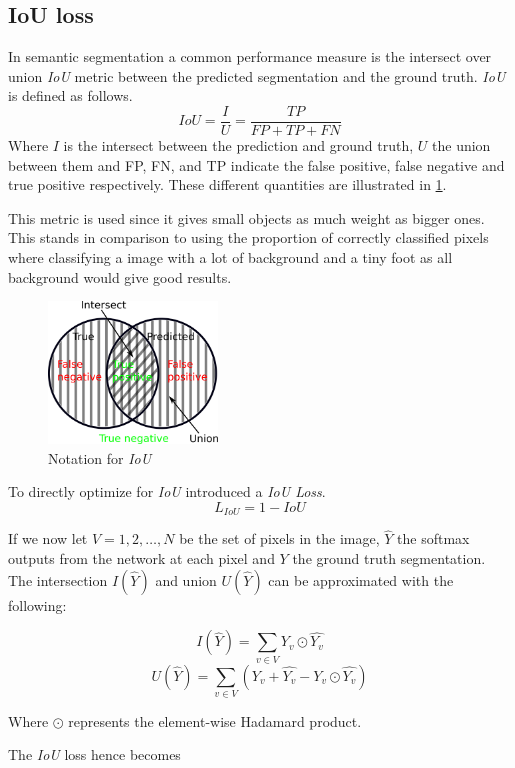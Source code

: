 \documentclass{kththesis}
\begin{document}
\subsection{IoU loss}
In semantic segmentation a common performance measure is the intersect over union
\textit{IoU} metric between the predicted segmentation and the ground truth.
\textit{IoU} is defined as follows.
\[IoU = \frac{I}{U} = \frac{\textit{TP}}{\textit{FP} + \textit{TP} + \textit{FN}}\]
Where \(I\) is the intersect between the prediction and ground truth, \(U\) the union
between them and FP, FN, and TP indicate the false positive, false negative and
true positive respectively. These different quantities are illustrated in \cref{fig:IoU}.

This metric is used since it gives small objects as much weight as bigger ones.
This stands in comparison to using the proportion of correctly classified pixels
where classifying a image with a lot of background and a tiny foot as all background
would give good results.

\begin{figure}[h]
  \centering
  \includegraphics[width=0.40\textwidth]{IoU}
  \caption{Notation for \textit{IoU}}
  \label{fig:IoU}
\end{figure}


To directly optimize for \textit{IoU} \textcite{rahman2016optimizing} introduced
a \textit{IoU Loss}.
\[L_{IoU} = 1 - \textit{IoU}\]

If we now let \(V = {1, 2, \dots, N}\) be the set of pixels in the image, \(\hat{Y}\)
the softmax outputs from the network at each pixel and \(Y\) the ground truth
segmentation. The intersection \(I(\hat{Y})\) and union \(U(\hat{Y})\) can be
approximated with the following:

\[I(\hat{Y}) = \sum_{v \in V} Y_v \odot \hat{Y_v}\]
\[U(\hat{Y}) = \sum_{v \in V}\left( Y_v + \hat{Y_v} - Y_v \odot \hat{Y_v} \right) \]

Where \(\odot\) represents the element-wise Hadamard product.

The \textit{IoU} loss hence becomes
\end{document}
